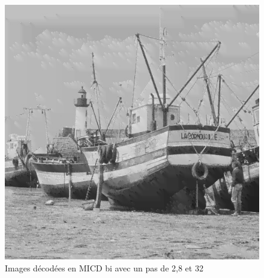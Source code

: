 \documentclass[12pt]{report}
\begin{document}
\begin{figure}[H]
\begin{center}
\includegraphics[scale=0.25]{../ImageRes/ImagedecodeeMICDbiQ32.jpg} 
\caption{Images décodées en MICD bi avec un pas de 2,8 et 32 }
\end{center}
\end{figure}
\end{document}
